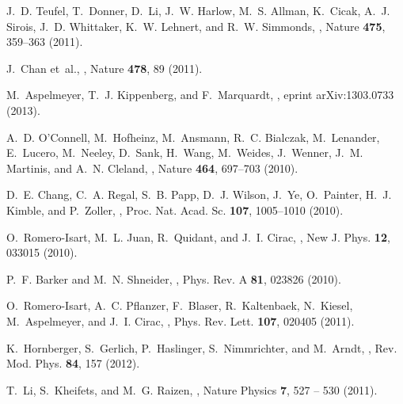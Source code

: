 \documentclass[11pt]{article}
\begin{document}
\begin{thebibliography}{100}
J.~D. Teufel, T.~Donner, D.~Li, J.~W. Harlow, M.~S. Allman, K.~Cicak, A.~J.
  Sirois, J.~D. Whittaker, K.~W. Lehnert, and R.~W. Simmonds,
,
\newblock Nature {\bf 475}, 359--363 (2011).

J.~Chan et~al.,
,
\newblock Nature {\bf 478}, 89 (2011).

M.~Aspelmeyer, T.~J. Kippenberg, and F.~Marquardt,
,
\newblock eprint arXiv:1303.0733  (2013).

A.~D. O'Connell, M.~Hofheinz, M.~Ansmann, R.~C. Bialczak, M.~Lenander,
  E.~Lucero, M.~Neeley, D.~Sank, H.~Wang, M.~Weides, J.~Wenner, J.~M. Martinis,
  and A.~N. Cleland,
,
\newblock Nature {\bf 464}, 697--703 (2010).

D.~E. Chang, C.~A. Regal, S.~B. Papp, D.~J. Wilson, J.~Ye, O.~Painter, H.~J.
  Kimble, and P.~Zoller,
,
\newblock Proc. Nat. Acad. Sc. {\bf 107}, 1005--1010 (2010).

O.~Romero-Isart, M.~L. Juan, R.~Quidant, and J.~I. Cirac,
,
\newblock New J. Phys. {\bf 12}, 033015 (2010).

P.~F. Barker and M.~N. Shneider,
,
\newblock Phys. Rev. A {\bf 81}, 023826 (2010).

O.~Romero-Isart, A.~C. Pflanzer, F.~Blaser, R.~Kaltenbaek, N.~Kiesel,
  M.~Aspelmeyer, and J.~I. Cirac,
,
\newblock Phys. Rev. Lett. {\bf 107}, 020405 (2011).

K.~Hornberger, S.~Gerlich, P.~Haslinger, S.~Nimmrichter, and M.~Arndt,
,
\newblock Rev. Mod. Phys. {\bf 84}, 157 (2012).

T.~Li, S.~Kheifets, and M.~G. Raizen,
,
\newblock Nature Physics {\bf 7}, 527 -- 530 (2011).


\end{thebibliography}
\end{document}
